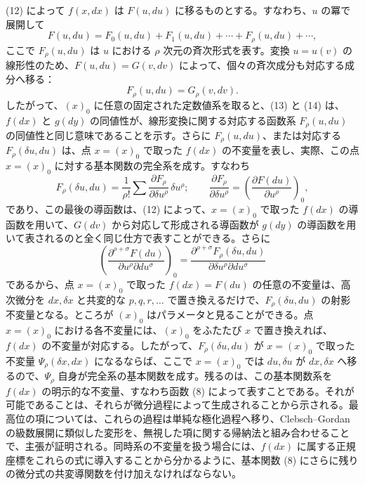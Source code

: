 \documentclass[11pt]{article}
\begin{document}
(12) によって \(f(x,dx)\) は \(F(u,du)\) に移るものとする。すなわち、\(u\) の冪で展開して
\begin{equation}
F(u,du)=F_0(u,du)+F_1(u,du)+\cdots+F_\rho(u,du)+\cdots,
\tag{13}
\end{equation}
ここで \(F_\rho(u,du)\) は \(u\) における \(\rho\) 次元の斉次形式を表す。変換 \(u=u(v)\) の線形性のため、\(F(u,du)=G(v,dv)\) によって、個々の斉次成分も対応する成分へ移る：
\begin{equation}
F_\rho(u,du)=G_\rho(v,dv).
\tag{14}
\end{equation}
したがって、\((x)_0\) に任意の固定された定数値系を取ると、(13) と (14) は、\(f(dx)\) と \(g(dy)\) の同値性が、線形変換に関する対応する函数系 \(F_\rho(u,du)\) の同値性と同じ意味であることを示す。さらに \(F_\rho(u,du)\)、または対応する \(F_\rho(\delta u,du)\) は、点 \(x=(x)_0\) で取った \(f(dx)\) の不変量を表し、実際、この点 \(x=(x)_0\) に対する基本関数の完全系を成す。すなわち
\[
F_\rho(\delta u,du)=\frac1{\rho!}\sum
\frac{\partial F_\rho}{\partial \delta u^\rho}\,\delta u^\rho;
\qquad
\frac{\partial F_\rho}{\partial \delta u^\rho}
=\left(\frac{\partial F(du)}{\partial u^\rho}\right)_0,
\]
であり、この最後の導函数は、(12) によって、\(x=(x)_0\) で取った \(f(dx)\) の導函数を用いて、\(G(dv)\) から対応して形成される導函数が \(g(dy)\) の導函数を用いて表されるのと全く同じ仕方で表すことができる。さらに
\[
\left(\frac{\partial^{\rho+\sigma}F(du)}
{\partial u^\rho\partial du^\sigma}\right)_0
=
\frac{\partial^{\rho+\sigma}F_\rho(\delta u,du)}
{\partial\delta u^\rho\partial du^\sigma}
\]
であるから、点 \(x=(x)_0\) で取った \(f(dx)=F(du)\) の任意の不変量は、高次微分を \(dx,\delta x\) と共変的な \(p,q,r,\ldots\) で置き換えるだけで、\(F_\rho(\delta u,du)\) の射影不変量となる。ところが \((x)_0\) はパラメータと見ることができる。点 \(x=(x)_0\) における各不変量には、\((x)_0\) をふたたび \(x\) で置き換えれば、\(f(dx)\) の不変量が対応する。したがって、\(F_\rho(\delta u,du)\) が \(x=(x)_0\) で取った不変量 \(\Psi_\rho(\delta x,dx)\) になるならば、ここで \(x=(x)_0\) では \(du,\delta u\) が \(dx,\delta x\) へ移るので、\(\Psi_\rho\) 自身が完全系の基本関数を成す。残るのは、この基本関数系を \(f(dx)\) の明示的な不変量、すなわち函数 (8) によって表すことである。それが可能であることは、それらが微分過程によって生成されることから示される。最高位の項については、これらの過程は単純な極化過程へ移り、Clebsch--Gordan の級数展開に類似した変形を、無視した項に関する帰納法と組み合わせることで、主張が証明される。同時系の不変量を扱う場合には、\(f(dx)\) に属する正規座標をこれらの式に導入することから分かるように、基本関数 (8) にさらに残りの微分式の共変導関数を付け加えなければならない。
\end{document}
